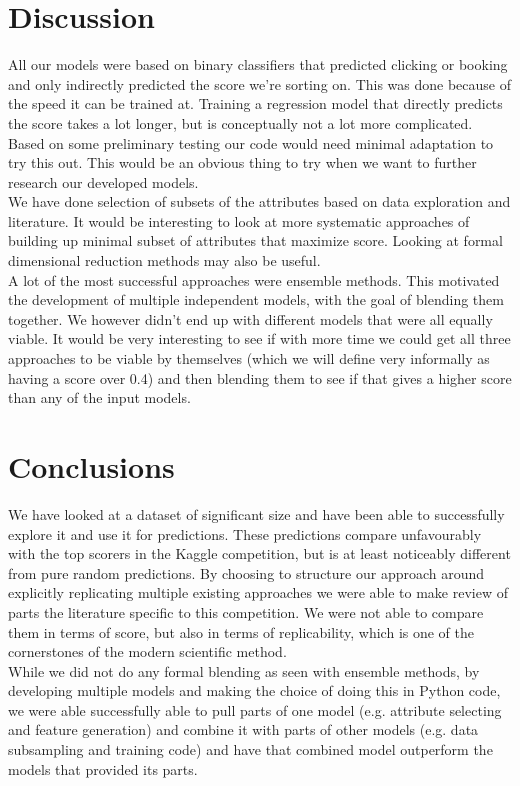 \documentclass{llncs}
\begin{document}
\section{Discussion}
All our models were based on binary classifiers that predicted clicking or booking and only indirectly predicted the score we're sorting on. This was done because of the speed it can be trained at. Training a regression model that directly predicts the score takes a lot longer, but is conceptually not a lot more complicated. Based on some preliminary testing our code would need minimal adaptation to try this out. This would be an obvious thing to try when we want to further research our developed models.\\
We have done selection of subsets of the attributes based on data exploration and literature. It would be interesting to look at more systematic approaches of building up minimal subset of attributes that maximize score. Looking at formal dimensional reduction methods may also be useful.\\
A lot of the most successful approaches were ensemble methods. This motivated the development of multiple independent models, with the goal of blending them together. We however didn't end up with different models that were all equally viable. It would be very interesting to see if with more time we could get all three approaches to be viable by themselves (which we will define very informally as having a score over 0.4) and then blending them to see if that gives a higher score than any of the input models.
\section{Conclusions}
We have looked at a dataset of significant size and have been able to successfully explore it and use it for predictions. These predictions compare unfavourably with the top scorers in the Kaggle competition, but is at least noticeably different from pure random predictions. By choosing to structure our approach around explicitly replicating multiple existing approaches we were able to make review of parts the literature specific to this competition. We were not able to compare them in terms of score, but also in terms of replicability, which is one of the cornerstones of the modern scientific method.\\
While we did not do any formal blending as seen with ensemble methods, by developing multiple models and making the choice of doing this in Python code, we were able successfully able to pull parts of one model (e.g. attribute selecting and feature generation) and combine it with parts of other models (e.g. data subsampling and training code) and have that combined model outperform the models that provided its parts.


\end{document}
